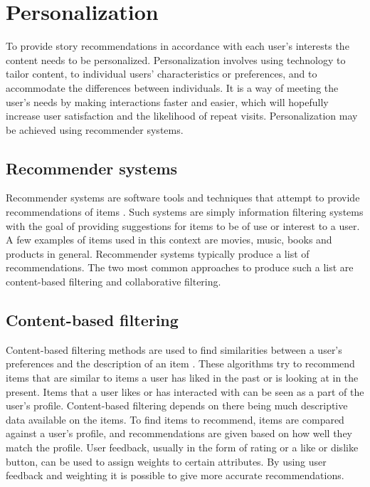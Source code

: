 \section{Personalization}
\label{sec:personalization_algorithms}

To provide story recommendations in accordance with each user's interests the content needs to be personalized. Personalization involves using technology to tailor content, to individual users' characteristics or preferences, and to accommodate the differences between individuals. It is a way of meeting the user's needs by making interactions faster and easier, which will hopefully increase user satisfaction and the likelihood of repeat visits. Personalization may be achieved using recommender systems.

\subsection{Recommender systems}

Recommender systems are software tools and techniques that attempt to provide recommendations of items \cite{HM4}. Such systems are simply information filtering systems with the goal of providing suggestions for items to be of use or interest to a user. A few examples of items used in this context are movies, music, books and products in general. Recommender systems typically produce a list of recommendations.  The two most common approaches to produce such a list are content-based filtering and collaborative filtering.

\subsection{Content-based filtering}

Content-based filtering methods are used to find similarities between a user's preferences and the description of an item \cite{HM5}. These algorithms try to recommend items that are similar to items a user has liked in the past or is looking at in the present. Items that a user likes or has interacted with can be seen as a part of the user's profile. Content-based filtering depends on there being much descriptive data available on the items. To find items to recommend, items are compared against a user's profile, and recommendations are given based on how well they match the profile. User feedback, usually in the form of rating or a like or dislike button, can be used to assign weights to certain attributes. By using user feedback and weighting it is possible to give more accurate recommendations. \cite{HM4}

